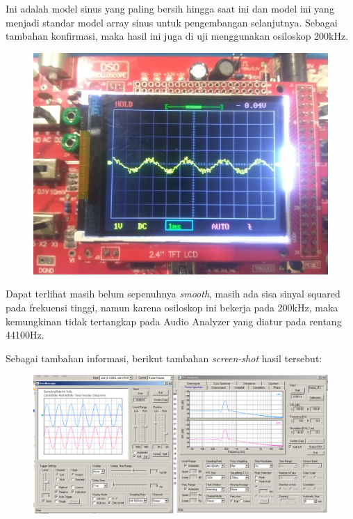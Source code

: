 \documentclass[12pt,]{article}
\begin{document}
  	Ini adalah model sinus yang paling bersih hingga saat ini
  	dan model ini yang menjadi standar model array sinus untuk pengembangan selanjutnya.
  	Sebagai tambahan konfirmasi, maka hasil ini juga di uji menggunakan osiloskop 200kHz.
  	\begin{figure}[H]
  		\centering
  		\includegraphics[width=0.45\linewidth]{result/day_4/goodsine}
  	\end{figure}
  	Dapat terlihat masih belum sepenuhnya \textit{smooth},
  	masih ada sisa sinyal squared pada frekuensi tinggi,
  	namun karena osiloskop ini bekerja pada 200kHz,
  	maka kemungkinan tidak tertangkap pada Audio Analyzer yang diatur pada rentang 44100Hz.

  	\newpage
  	Sebagai tambahan informasi, berikut tambahan \textit{screen-shot} hasil tersebut:
  	\begin{figure}[H]
  		\centering
  		\includegraphics[width=0.9\linewidth]{result/day_4/BestResult}
  	\end{figure}
\end{document}
